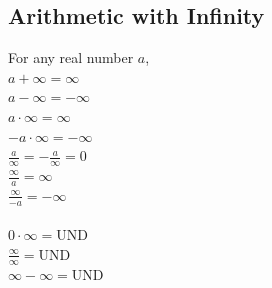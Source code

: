 \documentclass{article}
\begin{document}
        \subsection{Arithmetic with Infinity}
            For any real number $a$, \\
            $a+\infty=\infty$ \\
            $a-\infty=-\infty$ \\
            $a\cdot\infty=\infty$ \\
            $-a\cdot\infty=-\infty$ \\
            $\frac{a}{\infty}=-\frac{a}{\infty}=0$ \\
            $\frac{\infty}{a}=\infty$ \\
            $\frac{\infty}{-a}=-\infty$ \\
            \\
            $0\cdot\infty=$UND \\
            $\frac{\infty}{\infty}=$UND \\
            $\infty-\infty =$UND \\
\end{document}

